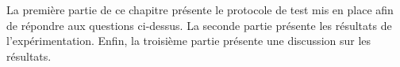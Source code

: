 La première partie de ce chapitre présente le protocole de test mis en place afin de répondre aux questions ci-dessus. La seconde partie présente les résultats de l'expérimentation. Enfin, la troisième partie présente une discussion sur les résultats. 






